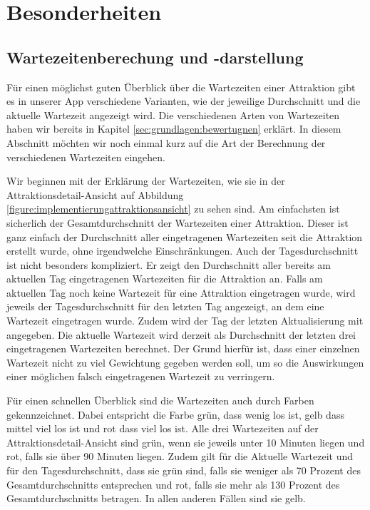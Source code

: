 \section{Besonderheiten}
\label{sec:implementierung:besonderheiten}

\subsection{Wartezeitenberechung und -darstellung}
\label{sec:implementierung:besonderheiten:wartezeit}

Für einen möglichst guten Überblick über die Wartezeiten einer Attraktion gibt es in unserer App verschiedene Varianten, wie der jeweilige Durchschnitt und die aktuelle Wartezeit angezeigt wird. Die verschiedenen Arten von Wartezeiten haben wir bereits in Kapitel \ref{sec:grundlagen:bewertugnen} erklärt. In diesem Abschnitt möchten wir noch einmal kurz auf die Art der Berechnung der verschiedenen Wartezeiten eingehen. 

Wir beginnen mit der Erklärung der Wartezeiten, wie sie in der Attraktionsdetail-Ansicht auf Abbildung \ref{figure:implementierungattraktionsansicht} zu sehen sind. Am einfachsten ist sicherlich der Gesamtdurchschnitt der Wartezeiten einer Attraktion. Dieser ist ganz einfach der Durchschnitt aller eingetragenen Wartezeiten seit die Attraktion erstellt wurde, ohne irgendwelche Einschränkungen. Auch der Tagesdurchschnitt ist nicht besonders kompliziert. Er zeigt den Durchschnitt aller bereits am aktuellen Tag eingetragenen Wartezeiten für die Attraktion an. Falls am aktuellen Tag noch keine Wartezeit für eine Attraktion eingetragen wurde, wird jeweils der Tagesdurchschnitt für den letzten Tag angezeigt, an dem eine Wartezeit eingetragen wurde. Zudem wird der Tag der letzten Aktualisierung mit angegeben. Die aktuelle Wartezeit wird derzeit als Durchschnitt der letzten drei eingetragenen Wartezeiten berechnet. Der Grund hierfür ist, dass einer einzelnen Wartezeit nicht zu viel Gewichtung gegeben werden soll, um so die Auswirkungen einer möglichen falsch eingetragenen Wartezeit zu verringern.

Für einen schnellen Überblick sind die Wartezeiten auch durch Farben gekennzeichnet. Dabei entspricht die Farbe grün, dass wenig los ist, gelb dass mittel viel los ist und rot dass viel los ist. Alle drei Wartezeiten auf der Attraktionsdetail-Ansicht sind grün, wenn sie jeweils unter 10 Minuten liegen und rot, falls sie über 90 Minuten liegen. Zudem gilt für die Aktuelle Wartezeit und für den Tagesdurchschnitt, dass sie grün sind, falls sie weniger als 70 Prozent des Gesamtdurchschnitts entsprechen und rot, falls sie mehr als 130 Prozent des Gesamtdurchschnitts betragen. In allen anderen Fällen sind sie gelb. 

